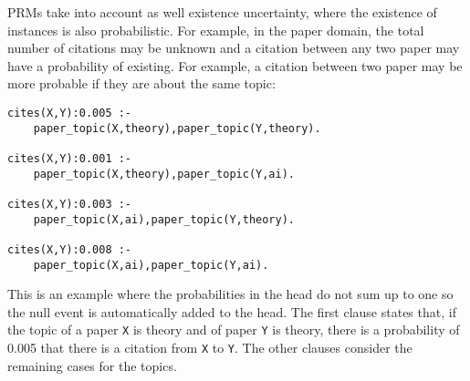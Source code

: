 \documentclass[a4paper,12pt]{article}
\begin{document}
PRMs take into account as well existence uncertainty, where the existence of instances is also probabilistic. For example, in the paper domain, the total number of citations may be unknown and  a citation between any two paper may have a probability of existing. For example, a citation between two paper may be more probable if they are about the same topic:
\begin{verbatim}
cites(X,Y):0.005 :- 
    paper_topic(X,theory),paper_topic(Y,theory).

cites(X,Y):0.001 :- 
    paper_topic(X,theory),paper_topic(Y,ai).

cites(X,Y):0.003 :- 
    paper_topic(X,ai),paper_topic(Y,theory).

cites(X,Y):0.008 :- 
    paper_topic(X,ai),paper_topic(Y,ai).
\end{verbatim}
This is an example where the probabilities in the head do not sum up to one so the null event is automatically added to the head.
The first clause states that, if the topic of a paper \texttt{X} is theory and  of  paper \texttt{Y} is theory, there is a probability of 0.005 that there is a citation from \texttt{X} to \texttt{Y}. The other clauses consider the remaining cases for the topics.
\end{document}
